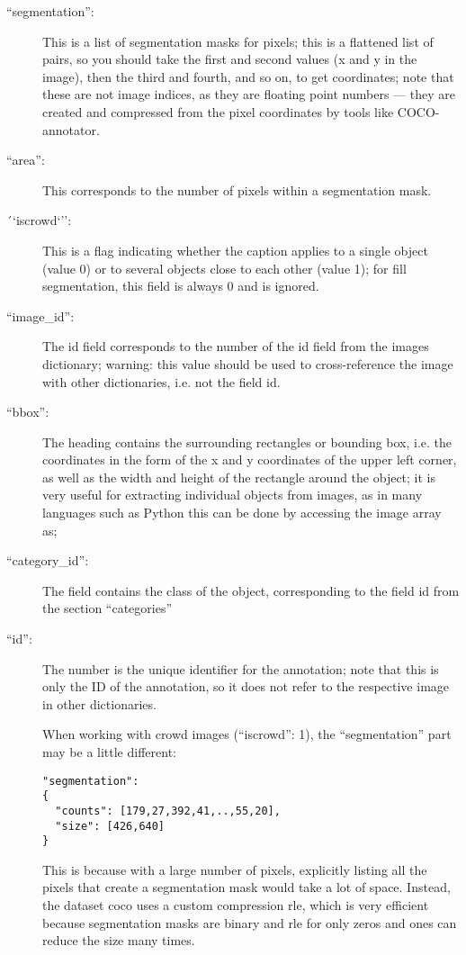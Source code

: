 \begin{description}
  \item[``segmentation'':] This is a list of segmentation masks for pixels; this is a flattened list of pairs, so you should take the first and second values (x and y in the image), then the third and fourth, and so on, to get coordinates; note that these are not image indices, as they are floating point numbers --- they are created and compressed from the pixel coordinates by tools like COCO-annotator.

  \item [``area'':] This corresponds to the number of pixels within a segmentation mask.

  \item [´`iscrowd`'':] This is a flag indicating whether the caption applies to a single object (value 0) or to several objects close to each other (value 1); for fill segmentation, this field is always 0 and is ignored.

  \item [``image\_id'':] The id field corresponds to the number of the id field from the images dictionary; warning: this value should be used to cross-reference the image with other dictionaries, i.e. not the  field id.

  \item [``bbox'':] The heading contains the surrounding rectangles or bounding box, i.e. the coordinates in the form of the x and y coordinates of the upper left corner, as well as the width and height of the rectangle around the object; it is very useful for extracting individual objects from images, as in many languages such as Python this can be done by accessing the image array as; 
  
  
  \item [``category\_id'':] The field contains the class of the object, corresponding to the field id from the section ``categories''

  \item [``{}id'':] The number is the unique identifier for the annotation; note that this is only the ID of the annotation, so it does not refer to the respective image in other dictionaries.

  \medskip
   
  When working with crowd images (``iscrowd'': 1), the ``segmentation'' part may be a little different:

  \begin{lstlisting}
"segmentation":
{
  "counts": [179,27,392,41,..,55,20],
  "size": [426,640]
}
  \end{lstlisting}

  \bigskip

  This is because with a large number of pixels, explicitly listing all the pixels that create a segmentation mask would take a lot of space. Instead, the dataset \ac{coco} uses a custom compression \ac{rle}, which is very efficient because segmentation masks are binary and \ac{rle} for only zeros and ones can reduce the size many times.

\end{description}

